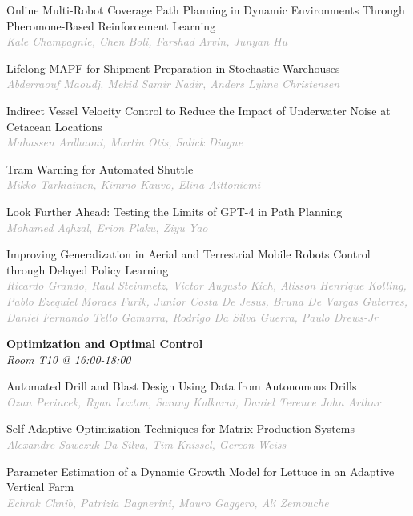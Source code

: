 \begin{multicols*}{2}
\small Online Multi-Robot Coverage Path Planning in Dynamic Environments Through Pheromone-Based Reinforcement Learning\\ 
\footnotesize \textcolor{darkgray}{\textit{Kale Champagnie, Chen  Boli, Farshad  Arvin, Junyan  Hu}}

\small Lifelong MAPF for Shipment Preparation in Stochastic Warehouses\\ 
\footnotesize \textcolor{darkgray}{\textit{Abderraouf Maoudj, Mekid  Samir Nadir, Anders Lyhne  Christensen}}

\small Indirect Vessel Velocity Control to Reduce the Impact of Underwater Noise at Cetacean Locations\\ 
\footnotesize \textcolor{darkgray}{\textit{Mahassen Ardhaoui, Martin  Otis, Salick  Diagne}}

\small Tram Warning for Automated Shuttle\\ 
\footnotesize \textcolor{darkgray}{\textit{Mikko Tarkiainen, Kimmo  Kauvo, Elina  Aittoniemi}}

\small Look Further Ahead: Testing the Limits of GPT-4 in Path Planning\\ 
\footnotesize \textcolor{darkgray}{\textit{Mohamed Aghzal, Erion  Plaku, Ziyu  Yao}}

\small Improving Generalization in Aerial and Terrestrial Mobile Robots Control through Delayed Policy Learning\\ 
\footnotesize \textcolor{darkgray}{\textit{Ricardo Grando, Raul  Steinmetz, Victor Augusto  Kich, Alisson Henrique  Kolling, Pablo Ezequiel Moraes  Furik, Junior  Costa De Jesus, Bruna De Vargas  Guterres, Daniel Fernando  Tello Gamarra, Rodrigo  Da Silva Guerra, Paulo  Drews-Jr}}

\normalsize \textbf{Optimization and Optimal Control}\\
\small \textit{Room T10 @ 16:00-18:00}

\small Automated Drill and Blast Design Using Data from Autonomous Drills\\ 
\footnotesize \textcolor{darkgray}{\textit{Ozan Perincek, Ryan  Loxton, Sarang  Kulkarni, Daniel Terence John  Arthur}}

\small Self-Adaptive Optimization Techniques for Matrix Production Systems\\ 
\footnotesize \textcolor{darkgray}{\textit{Alexandre Sawczuk Da Silva, Tim  Knissel, Gereon  Weiss}}

\small Parameter Estimation of a Dynamic Growth Model for Lettuce in an Adaptive Vertical Farm\\ 
\footnotesize \textcolor{darkgray}{\textit{Echrak Chnib, Patrizia  Bagnerini, Mauro  Gaggero, Ali  Zemouche}}


\end{multicols*}
